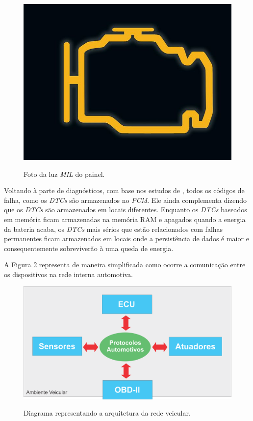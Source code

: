 \begin{figure}[!ht]
\centering
\caption{Foto da luz \textit{MIL} do painel.} 
{\includegraphics[scale=.15]{imagens/luzMil.jpg}}\\
 \label{Fig:luz_mil}
\end{figure}

Voltando à parte de diagnósticos, com base nos estudos de , todos os códigos de falha, como os \textit{DTCs} são armazenados no \textit{PCM}. Ele ainda complementa dizendo que os \textit{DTCs} são armazenados em locais diferentes. Enquanto os \textit{DTCs} baseados em memória ficam armazenadas na memória RAM e apagados quando a energia da bateria acaba, os \textit{DTCs} mais sérios que estão relacionados com falhas permanentes ficam armazenados em locais onde a persistência de dados é maior e consequentemente sobreviverão à uma queda de energia.

A Figura \ref{Fig:rede_veicular} representa de maneira simplificada como ocorre a comunicação entre os dispositivos na rede interna automotiva.

\begin{figure}[!ht]
\centering
\caption{Diagrama representando a arquitetura da rede veicular.} 
{\includegraphics[scale=.32]{imagens/arquiteturaRedeVeicular.png}}\\
 \label{Fig:rede_veicular}
\end{figure}


